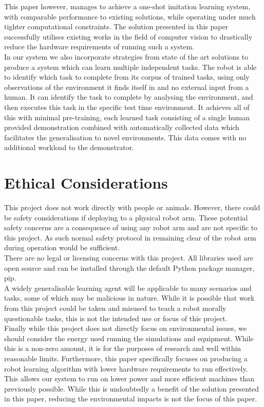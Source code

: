 This paper however, manages to achieve a one-shot imitation learning system, with comparable performance to existing solutions, while operating under much tighter computational constraints. The solution presented in this paper successfully utilises existing works in the field of computer vision to drastically reduce the hardware requirements of running such a system.\\

In our system we also incorporate strategies from state of the art solutions to produce a system which can learn multiple independent tasks. The robot is able to identify which task to complete from its corpus of trained tasks, using only observations of the environment it finds itself in and no external input from a human. It can identify the task to complete by analysing the environment, and then executes this task in the specific test time environment. It achieves all of this with minimal pre-training, each learned task consisting of a single human provided demonstration combined with automatically collected data which facilitates the generalisation to novel environments. This data comes with no additional workload to the demonstrator.

\section{Ethical Considerations}
This project does not work directly with people or animals. However, there could be safety considerations if deploying to a physical robot arm. These potential safety concerns are a consequence of using any robot arm and are not specific to this project. As such normal safety protocol in remaining clear of the robot arm during operation would be sufficient.\\
There are no legal or licensing concerns with this project. All libraries used are open source and can be installed through the default Python package manager, pip.\\
A widely generalisable learning agent will be applicable to many scenarios and tasks, some of which may be malicious in nature. While it is possible that work from this project could be taken and misused to teach a robot morally questionable tasks, this is not the intended use or focus of this project.\\
Finally while this project does not directly focus on environmental issues, we should consider the energy used running the simulations and equipment. While this is a non-zero amount, it is for the purposes of research and well within reasonable limits. Furthermore, this paper specifically focuses on producing a robot learning algorithm with lower hardware requirements to run effectively. This allows our system to run on lower power and more efficient machines than previously possible. While this is undoubtedly a benefit of the solution presented in this paper, reducing the environmental impacts is not the focus of this paper.